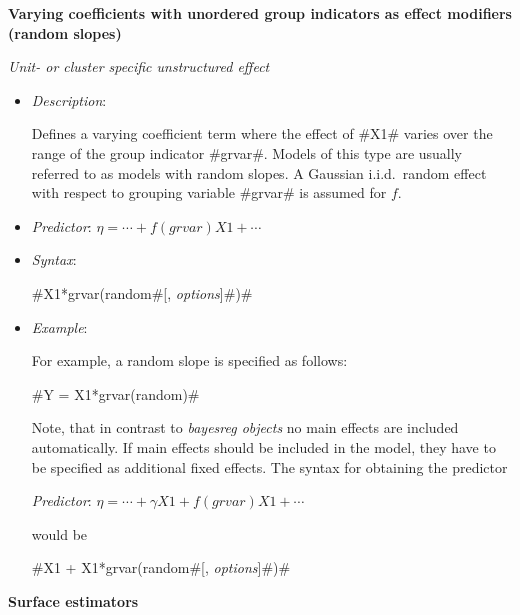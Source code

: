 {\bf Varying coefficients with unordered group indicators as
effect modifiers (random slopes)}
\medskip

{\em Unit- or cluster specific unstructured effect}
\begin{itemize}
\item[] {\em Description}:

Defines a varying coefficient term where the effect of #X1# varies
over the range of the group indicator #grvar#. Models of this type
are usually referred to as models with random slopes. A Gaussian
i.i.d.~random effect with respect to grouping variable #grvar# is
assumed for $f$.
\item[] {\em Predictor}: $\eta = \cdots + f(grvar)X1 + \cdots$
\item[] {\em Syntax}:

#X1*grvar(random#[, {\em options}]#)#
\item[] {\em Example}:

For example, a random slope is specified as follows:

#Y = X1*grvar(random)#

Note, that in contrast to {\em bayesreg objects} no main effects
are included automatically. If main effects should be included in
the model, they have to be specified as additional fixed effects.
The syntax for obtaining the predictor

{\em Predictor}: $\eta = \cdots + \gamma X1 + f(grvar)X1 + \cdots$

would be

#X1 + X1*grvar(random#[, {\em options}]#)#

\end{itemize}


{\bf Surface estimators}
\medskip

